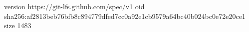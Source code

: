 version https://git-lfs.github.com/spec/v1
oid sha256:af2813beb76bfb8c894779dfed7cc0a92e1cb9579a64bc40b024bc0e72e20ce1
size 1483
